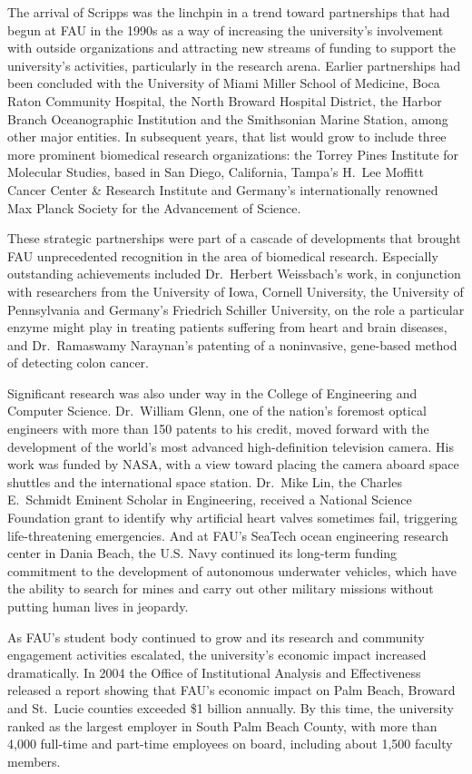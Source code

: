 \documentclass{article}
\begin{document}
The arrival of Scripps was the linchpin in a trend toward partnerships that had begun at FAU in the 1990s as a way of increasing the university's involvement with outside organizations and attracting new streams of funding to support the university's activities, particularly in the research arena.  Earlier partnerships had been concluded with the University of Miami Miller School of Medicine, Boca Raton Community Hospital, the North Broward Hospital District, the Harbor Branch Oceanographic Institution and the Smithsonian Marine Station, among other major entities.  In subsequent years, that list would grow to include three more prominent biomedical research organizations: the Torrey Pines Institute for Molecular Studies, based in San Diego, California, Tampa's H.\ Lee Moffitt Cancer Center \& Research Institute and Germany's internationally renowned Max Planck Society for the Advancement of Science.

These strategic partnerships were part of a cascade of developments that brought FAU unprecedented recognition in the area of biomedical research.  Especially outstanding achievements included Dr.\ Herbert Weissbach's work, in conjunction with researchers from the University of Iowa, Cornell University, the University of Pennsylvania and Germany's Friedrich Schiller University, on the role a particular enzyme might play in treating patients suffering from heart and brain diseases, and Dr.\ Ramaswamy Naraynan's patenting of a noninvasive, gene-based method of detecting colon cancer.

Significant research was also under way in the College of Engineering and Computer Science. Dr.\ William Glenn, one of the nation's foremost optical engineers with more than 150 patents to his credit, moved forward with the development of the world's most advanced high-definition television camera.  His work was funded by NASA, with a view toward placing the camera aboard space shuttles and the international space station.  Dr.\ Mike Lin, the Charles E.\ Schmidt Eminent Scholar in Engineering, received a National Science Foundation grant to identify why artificial heart valves sometimes fail, triggering life-threatening emergencies.  And at FAU's SeaTech ocean engineering research center in Dania Beach, the U.S. Navy continued its long-term funding commitment to the development of autonomous underwater vehicles, which have the ability to search for mines and carry out other military missions without putting human lives in jeopardy.

As FAU's student body continued to grow and its research and community engagement activities escalated, the university's economic impact increased dramatically.  In 2004 the Office of Institutional Analysis and Effectiveness released a report showing that FAU's economic impact on Palm Beach, Broward and St.\ Lucie counties exceeded \$1 billion annually.  By this time, the university ranked as the largest employer in South Palm Beach County, with more than 4,000 full-time and part-time employees on board, including about 1,500 faculty members.
\end{document}
